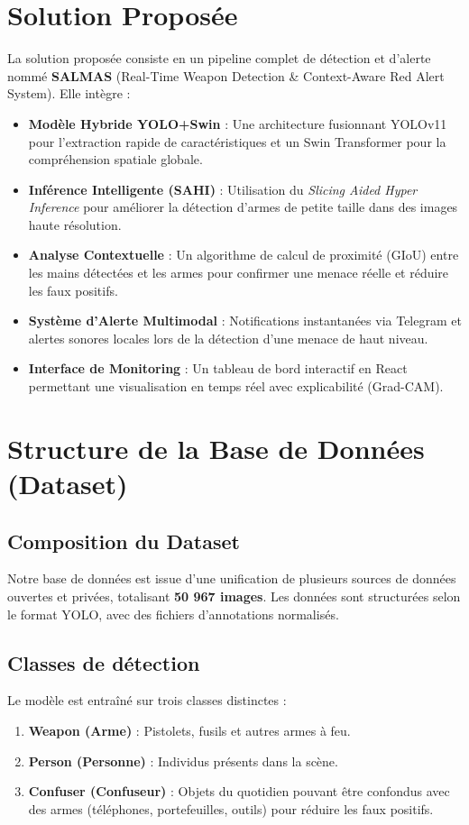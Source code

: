 \documentclass[a4paper,12pt]{article}
\begin{document}
\section{Solution Proposée}
La solution proposée consiste en un pipeline complet de détection et d'alerte nommé \textbf{SALMAS} (Real-Time Weapon Detection & Context-Aware Red Alert System). Elle intègre :
\begin{itemize}
    \item \textbf{Modèle Hybride YOLO+Swin} : Une architecture fusionnant YOLOv11 pour l'extraction rapide de caractéristiques et un Swin Transformer pour la compréhension spatiale globale.
    \item \textbf{Inférence Intelligente (SAHI)} : Utilisation du \textit{Slicing Aided Hyper Inference} pour améliorer la détection d'armes de petite taille dans des images haute résolution.
    \item \textbf{Analyse Contextuelle} : Un algorithme de calcul de proximité (GIoU) entre les mains détectées et les armes pour confirmer une menace réelle et réduire les faux positifs.
    \item \textbf{Système d'Alerte Multimodal} : Notifications instantanées via Telegram et alertes sonores locales lors de la détection d'une menace de haut niveau.
    \item \textbf{Interface de Monitoring} : Un tableau de bord interactif en React permettant une visualisation en temps réel avec explicabilité (Grad-CAM).
\end{itemize}

\section{Structure de la Base de Données (Dataset)}
\subsection{Composition du Dataset}
Notre base de données est issue d'une unification de plusieurs sources de données ouvertes et privées, totalisant \textbf{50 967 images}.
Les données sont structurées selon le format YOLO, avec des fichiers d'annotations normalisés.

\subsection{Classes de détection}
Le modèle est entraîné sur trois classes distinctes :
\begin{enumerate}
    \item \textbf{Weapon (Arme)} : Pistolets, fusils et autres armes à feu.
    \item \textbf{Person (Personne)} : Individus présents dans la scène.
    \item \textbf{Confuser (Confuseur)} : Objets du quotidien pouvant être confondus avec des armes (téléphones, portefeuilles, outils) pour réduire les faux positifs.
\end{enumerate}
\end{document}
